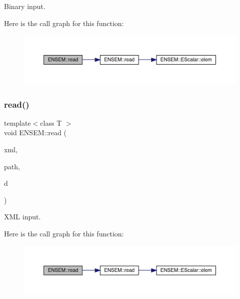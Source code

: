 Binary input. 

Here is the call graph for this function\+:\nopagebreak
\begin{figure}[H]
\begin{center}
\leavevmode
\includegraphics[width=350pt]{df/d3c/group__primseed_ga89a527bfdc043ff49f07e44a2fbb7a90_cgraph}
\end{center}
\end{figure}
\mbox{\label{group__primseed_ga419a0f6fba320ad373bae7c40e3d2330}} 
\subsubsection{\texorpdfstring{read()}{read()}\hspace{0.1cm}{\footnotesize\ttfamily [2/2]}}
{\footnotesize\ttfamily template$<$class T $>$ \\
void E\+N\+S\+E\+M\+::read (\begin{DoxyParamCaption}\item[{\mbox{\hyperlink{classADATXML_1_1XMLReader}{A\+D\+A\+T\+X\+M\+L\+::\+X\+M\+L\+Reader}} \&}]{xml,  }\item[{const std\+::string \&}]{path,  }\item[{\mbox{\hyperlink{classENSEM_1_1PSeed}{P\+Seed}}$<$ T $>$ \&}]{d }\end{DoxyParamCaption})\hspace{0.3cm}{\ttfamily [inline]}}



X\+ML input. 

Here is the call graph for this function\+:\nopagebreak
\begin{figure}[H]
\begin{center}
\leavevmode
\includegraphics[width=350pt]{df/d3c/group__primseed_ga419a0f6fba320ad373bae7c40e3d2330_cgraph}
\end{center}
\end{figure}
\mbox{\label{group__primseed_gace5eb402052ee22e28bfd72ab7e92194}} 
